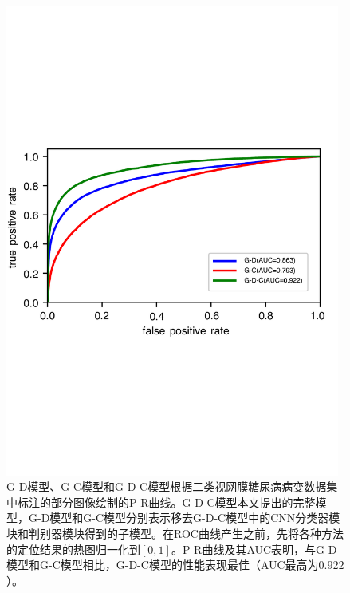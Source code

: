 \begin{figure}[h]
	\centering
	\includegraphics[width=0.98\textwidth]{figure/ROC_u_d_u_c_u_d_c_components}
	\caption{G-D模型、G-C模型和G-D-C模型根据二类视网膜糖尿病病变数据集中标注的部分图像绘制的P-R曲线。G-D-C模型本文提出的完整模型，G-D模型和G-C模型分别表示移去G-D-C模型中的CNN分类器模块和判别器模块得到的子模型。在ROC曲线产生之前，先将各种方法的定位结果的热图归一化到$[0, 1]$。P-R曲线及其AUC表明，与G-D模型和G-C模型相比，G-D-C模型的性能表现最佳（AUC最高为$0.922$）。}
	\label{fig:roc_u_d_u_c_u_d_c_components}
\end{figure}

\endinput
